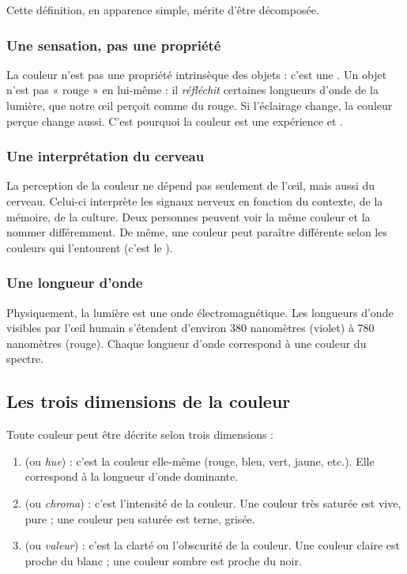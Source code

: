 Cette définition, en apparence simple, mérite d'être décomposée.

\subsubsection{Une sensation, pas une propriété}

La couleur n'est pas une propriété intrinsèque des objets : c'est une . Un objet n'est pas « rouge » en lui-même : il \emph{réfléchit} certaines longueurs d'onde de la lumière, que notre œil perçoit comme du rouge. Si l'éclairage change, la couleur perçue change aussi. C'est pourquoi la couleur est une expérience  et .

\subsubsection{Une interprétation du cerveau}

La perception de la couleur ne dépend pas seulement de l'œil, mais aussi du cerveau. Celui-ci interprète les signaux nerveux en fonction du contexte, de la mémoire, de la culture. Deux personnes peuvent voir la même couleur et la nommer différemment. De même, une couleur peut paraître différente selon les couleurs qui l'entourent (c'est le ).

\subsubsection{Une longueur d'onde}

Physiquement, la lumière est une onde électromagnétique. Les longueurs d'onde visibles par l'œil humain s'étendent d'environ 380 nanomètres (violet) à 780 nanomètres (rouge). Chaque longueur d'onde correspond à une couleur du spectre.

\subsection{Les trois dimensions de la couleur}

Toute couleur peut être décrite selon trois dimensions :

\begin{enumerate}[label=\textbf{\arabic*.}]
    \item {} (ou \emph{hue}) : c'est la couleur elle-même (rouge, bleu, vert, jaune, etc.). Elle correspond à la longueur d'onde dominante.
    \item {} (ou \emph{chroma}) : c'est l'intensité de la couleur. Une couleur très saturée est vive, pure ; une couleur peu saturée est terne, grisée.
    \item {} (ou \emph{valeur}) : c'est la clarté ou l'obscurité de la couleur. Une couleur claire est proche du blanc ; une couleur sombre est proche du noir.
\end{enumerate}

